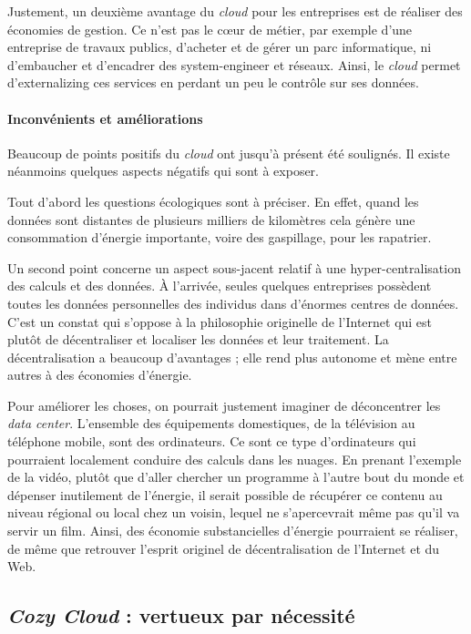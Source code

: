 Justement, un deuxième avantage du \textit{cloud} pour les entreprises est de réaliser des économies de gestion. Ce n'est pas le cœur de métier, par exemple d'une entreprise de travaux publics, d'acheter et de gérer un parc informatique, ni d'embaucher et d'encadrer des \gls{system-engineer} et réseaux. Ainsi, le \textit{cloud} permet d'\gls{externalizing} ces services en perdant un peu le contrôle sur ses données.

\paragraph*{Inconvénients et améliorations} Beaucoup de points positifs du \textit{cloud} ont jusqu'à présent été soulignés. Il existe néanmoins quelques aspects négatifs qui sont à exposer.

Tout d'abord les questions écologiques sont à préciser. En effet, quand les données sont distantes de plusieurs milliers de kilomètres cela génère une consommation d'énergie importante, voire des gaspillage, pour les rapatrier.

Un second point concerne un aspect sous-jacent relatif à  une hyper-centralisation des calculs et des données. À l'arrivée, seules quelques entreprises \pagebreak possèdent toutes les données personnelles des individus dans d'énormes centres de données. C'est un constat qui s'oppose à la philosophie originelle de l'Internet qui est plutôt de décentraliser et localiser les données et leur traitement. La décentralisation a beaucoup d'avantages ; elle rend plus autonome et mène entre autres à des économies d'énergie.

Pour améliorer les choses, on pourrait justement imaginer de déconcentrer les \textit{data center}. L'ensemble des équipements domestiques, de la télévision au téléphone mobile, sont des ordinateurs. Ce sont ce type d'ordinateurs qui pourraient localement conduire des calculs dans les nuages. En prenant l'exemple de la vidéo, plutôt que d'aller chercher un programme à l'autre bout du monde et dépenser inutilement de l'énergie, il serait possible de récupérer ce contenu au niveau régional ou local chez un voisin, lequel ne s’apercevrait même pas qu'il va servir un film. Ainsi, des économie substancielles d'énergie pourraient se réaliser, de même que retrouver l'esprit originel de décentralisation de l'Internet et du Web.



\subsection[\textit{Cozy Cloud} : nécessaire vertu]{\textit{Cozy Cloud} : vertueux par nécessité}
\label{sub:II.2.2}

